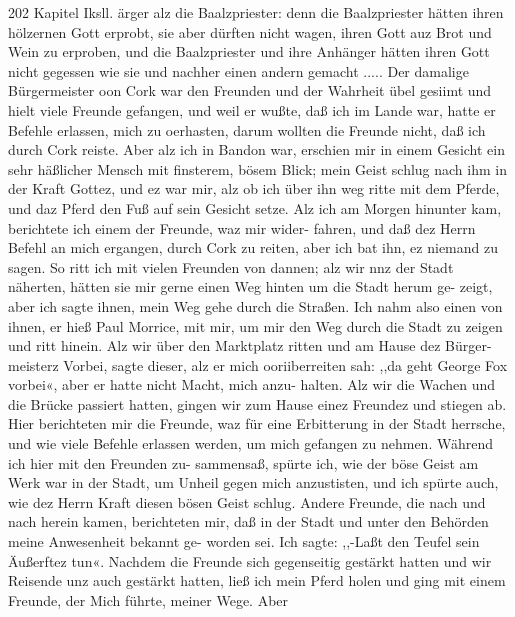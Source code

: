 202 Kapitel Iksll.
ärger alz die Baalzpriester: denn die Baalzpriester hätten ihren
hölzernen Gott erprobt, sie aber dürften nicht wagen, ihren Gott
auz Brot und Wein zu erproben, und die Baalzpriester und ihre
Anhänger hätten ihren Gott nicht gegessen wie sie und nachher
einen andern gemacht .....
Der damalige Bürgermeister oon Cork war den Freunden
und der Wahrheit übel gesiimt und hielt viele Freunde gefangen,
und weil er wußte, daß ich im Lande war, hatte er Befehle
erlassen, mich zu oerhasten, darum wollten die Freunde nicht,
daß ich durch Cork reiste. Aber alz ich in Bandon war, erschien
mir in einem Gesicht ein sehr häßlicher Mensch mit finsterem,
bösem Blick; mein Geist schlug nach ihm in der Kraft Gottez,
und ez war mir, alz ob ich über ihn weg ritte mit dem Pferde,
und daz Pferd den Fuß auf sein Gesicht setze. Alz ich am Morgen
hinunter kam, berichtete ich einem der Freunde, waz mir wider-
fahren, und daß dez Herrn Befehl an mich ergangen, durch Cork
zu reiten, aber ich bat ihn, ez niemand zu sagen. So ritt ich
mit vielen Freunden von dannen; alz wir nnz der Stadt näherten,
hätten sie mir gerne einen Weg hinten um die Stadt herum ge-
zeigt, aber ich sagte ihnen, mein Weg gehe durch die Straßen.
Ich nahm also einen von ihnen, er hieß Paul Morrice, mit mir,
um mir den Weg durch die Stadt zu zeigen und ritt hinein.
Alz wir über den Marktplatz ritten und am Hause dez Bürger-
meisterz Vorbei, sagte dieser, alz er mich ooriiberreiten sah: ,,da
geht George Fox vorbei«, aber er hatte nicht Macht, mich anzu-
halten. Alz wir die Wachen und die Brücke passiert hatten,
gingen wir zum Hause einez Freundez und stiegen ab. Hier
berichteten mir die Freunde, waz für eine Erbitterung in der
Stadt herrsche, und wie viele Befehle erlassen werden, um mich
gefangen zu nehmen. Während ich hier mit den Freunden zu-
sammensaß, spürte ich, wie der böse Geist am Werk war in der
Stadt, um Unheil gegen mich anzustisten, und ich spürte auch,
wie dez Herrn Kraft diesen bösen Geist schlug. Andere Freunde,
die nach und nach herein kamen, berichteten mir, daß in der
Stadt und unter den Behörden meine Anwesenheit bekannt ge-
worden sei. Ich sagte: ,,-Laßt den Teufel sein Äußerftez tun«.
Nachdem die Freunde sich gegenseitig gestärkt hatten und wir
Reisende unz auch gestärkt hatten, ließ ich mein Pferd holen und
ging mit einem Freunde, der Mich führte, meiner Wege. Aber


